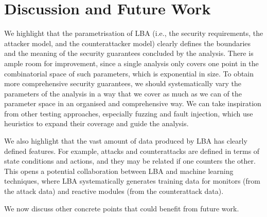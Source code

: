 {\section{Discussion and Future Work}
\label{sec:CPSRobustness:Discussion}
We highlight that the parametrisation of LBA (i.e., the security requirements, the attacker model, and the counterattacker model) clearly defines the boundaries and the meaning of the security guarantees concluded by the analysis. There is ample room for improvement, since a single analysis only covers one point in the combinatorial space of such parameters, which is exponential in size. To obtain more comprehensive security guarantees, we should systematically vary the parameters of the analysis in a way that we cover as much as we can of the parameter space in an organised and comprehensive way. We can take inspiration from other testing approaches, especially fuzzing and fault injection, which use heuristics to expand their coverage and guide the analysis. 

We also highlight that the vast amount of data produced by LBA has clearly defined features. For example, attacks and counterattacks are defined in terms of state conditions and actions, and they may be related if one counters the other. This opens a potential collaboration between LBA and machine learning techniques, where LBA systematically generates training data for monitors (from the attack data) and reactive modules (from the counterattack data).

We now discuss other concrete points that could benefit from future work.
}
